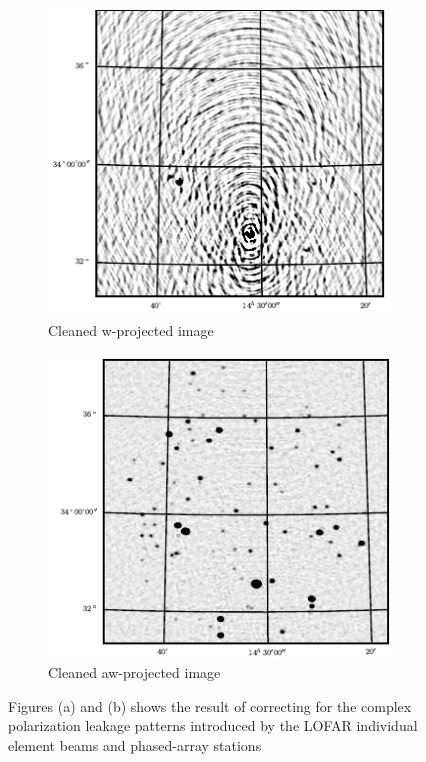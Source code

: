 \begin{figure}[h!]
 \centering
 \begin{subfigure}[b]{0.35\textwidth}
  \includegraphics[width=\textwidth]{images/lofar_no_dd.png}
  \caption{Cleaned w-projected image}
 \end{subfigure}
 \begin{subfigure}[b]{0.35\textwidth}
  \includegraphics[width=\textwidth]{images/lofar_dd.png}
  \caption{Cleaned aw-projected image}
 \end{subfigure}
 \caption[A-projection results on LOFAR]{Figures (a) and (b) shows the result of correcting for the complex polarization leakage patterns
 introduced by the LOFAR individual element beams and phased-array stations}
 \label{fig_aprojection_lofar}
\end{figure}

